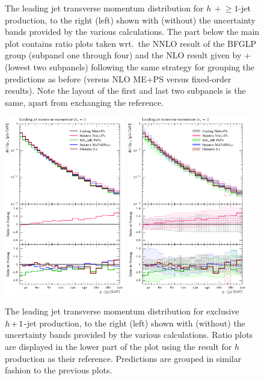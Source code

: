 \begin{figure}[t!]
  \caption{\label{fig:hjetscomp:results:1obs:j1pt}%
    The leading jet transverse momentum distribution for
    $h\,+\!\ge\!\!1$-jet production, to the right (left) shown with
    (without) the uncertainty bands provided by the various
    calculations. The part below the main plot contains ratio plots
    taken wrt.~the NNLO result of the BFGLP group (subpanel one
    through four) and the NLO result given by \GoSam+\Sherpa (lowest
    two subpanels) following the same strategy for grouping the
    predictions as before (\NNLOPS versus NLO ME+PS versus fixed-order
    results). Note the layout of the first and last two subpanels is
    the same, apart from exchanging the reference.}
\end{figure}

\begin{figure}[t!]
  \centering
  \includegraphics[width=0.47\textwidth]{figures/hjetscomp_u_jet1_pT_excl.pdf}
  \hfill
  \includegraphics[width=0.47\textwidth]{figures/hjetscomp_jet1_pT_excl.pdf}
  \caption{\label{fig:hjetscomp:results:1obs:j1pt_excl}%
    The leading jet transverse momentum distribution for exclusive
    $h\!\text{~+~}\!1$-jet production, to the right (left) shown with (without)
    the uncertainty bands provided by the various calculations. Ratio
    plots are displayed in the lower part of the plot using the
    \Powheg \NNLOPS result for $h$ production as their reference.
    Predictions are grouped in similar fashion to the previous plots.}
\end{figure}

